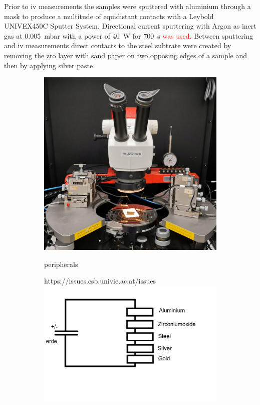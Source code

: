 \documentclass[a4paper]{article}
\newcommand{\td}[1]{\textcolor{red}{#1}}
\begin{document}
Prior to \gls{iv} measurements the samples were sputtered with aluminium 
through a mask to produce a multitude of equidistant contacts with a Leybold 
UNIVEX450C Sputter System.
Directional current sputtering with Argon as inert gas at \SI{0.005}{\milli\bar} with a 
power of \SI{40}{\watt} for \SI{700}{\second} \td{was used.}
Between sputtering and \gls{iv} measurements 
direct contacts to the steel subtrate were created by removing the \gls{zro} layer with 
sand paper on two opposing edges of a sample and then by applying silver paste.
\iffalse
\begin{figure}
	\centering
	\begin{subfigure}{0.48\textwidth}
		\centering
		\includegraphics[width=.9\textwidth]{Pics/i-v.png}
		\label{fig:iv-agilent}
		\caption{peripherals}
	\end{subfigure}
	\begin{subfigure}{0.48\textwidth}https://issues.csb.univie.ac.at/issues
		\centering
		\includegraphics[width=.9\textwidth]{Pics/circuit.png}

\end{subfigure}
\end{figure}
\end{document}
